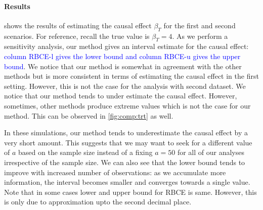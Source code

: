 \documentclass[preprint,12pt]{elsarticle}
\newcommand{\added}[1]{\textcolor{blue}{#1}}
\begin{document}
\paragraph{Results}
 shows the results of estimating the causal effect $\beta_T$
for the first and second scenarios.
For reference, recall the true value is $\beta_T=4$. 
As we perform a sensitivity analysis,
our method gives an interval estimate for the causal effect:
\added{column RBCE-l gives the lower bound
and column RBCE-u gives the upper bound}. We notice that our method is 
somewhat in agreement with the other methods but is more consistent
in terms of estimating the causal effect in the first setting. However, this is not the
case for the analysis with second dataset. We notice that our method tends to under
estimate the causal effect. However, sometimes, other methods produce extreme 
values which is not the case for our method. This can be observed in \cref{fig:comp:trt} as well. %

In these simulations, our method tends
to underestimate the causal effect by a very short amount.
This suggests that
we may want to seek for a different value of $a$ based on the sample size
instead of a fixing $a=50$ for all of our analyses irrespective of the
sample size.
We can also see that the lower bound tends to improve
with increased number of observations: as we accumulate
more information, the interval becomes smaller and converges towards
a single value. Note that in some cases lower and upper bound for 
RBCE is same. However, this is only due to approximation upto the
second decimal place.
\end{document}
